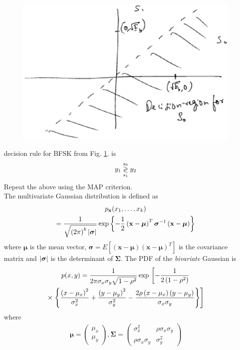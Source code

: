 \documentclass[10pt, a4paper]{article}
\providecommand{\sbrak}[1]{\ensuremath{{}\left[#1\right]}}
\providecommand{\brak}[1]{\ensuremath{\left(#1\right)}}
\begin{document}
\begin{enumerate}
\begin{figure}[!h]
\centering
\includegraphics[width=\columnwidth]{bfsk_const.eps}
\caption{}
\label{fig:bfsk_const}
\end{figure}
decision rule for BFSK from Fig. \ref{fig:bfsk_const}. is
\begin{equation}
y_1 \overset{s_0}{\underset{s_1}{\gtrless}} y_2
\end{equation}
Repeat the above using the MAP criterion.\\
\solution 
 The multivariate Gaussian distribution is defined as
%
\begin{multline}
\label{eq:multivariate}
p_{\mathbf{x}}(x_1,\dots,x_k)
\\
=\frac{1}{\sqrt{\brak{2\pi}^k\abs{\bm{\sigma}}}}\exp\cbrak{-\frac{1}{2}\brak{\mathbf{x}-\bm{\mu}}^T\bm{\sigma}^{-1}\brak{\mathbf{x}-\bm{\mu}}}
\end{multline}
%
where $\bm{\mu}$ is the mean vector, $\bm{\sigma} = E\sbrak{\brak{\mathbf{x}-\bm{\mu}}\brak{\mathbf{x}-\bm{\mu}}^T}$ is the covariance matrix and $\vert\bm{\sigma}\vert$ is the determinant of $\bm{\Sigma}$.
The PDF of the {\em bivariate} Gaussian is
{\small
\begin{multline}
\label{eq:bivariate}
p(x,y)= \frac{1}{2\pi \sigma_x\sigma_y\sqrt{1-\rho^2}}\exp\lsbrak{-\frac{1}{2\brak{1-\rho^2}}}
\\
\times \rsbrak{\cbrak{\frac{\brak{x-\mu_x}^2}{\sigma_x^2}+\frac{\brak{y-\mu_y}^2}{\sigma_y^2}-\frac{2\rho\brak{x-\mu_x}\brak{y-\mu_y}}{\sigma_x\sigma_y}}}
\end{multline}
}
%
where
%
\begin{align}
\bm{\mu}=
\begin{pmatrix}
\mu_x \\
\mu_y
\end{pmatrix},
\bm{\Sigma} = 
\begin{pmatrix}%
\sigma_x^2 & \rho\sigma_x\sigma_y \\
\rho\sigma_x\sigma_y & \sigma_y^2
\end{pmatrix}
\end{align}


\end{enumerate}
\end{document}
